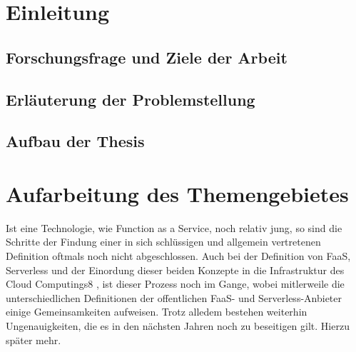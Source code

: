 \documentclass[11pt]{article}
\begin{document}
\section{Einleitung}
\subsection{Forschungsfrage und Ziele der Arbeit}
\subsection{Erläuterung der Problemstellung}
\subsection{Aufbau der Thesis}










\section{Aufarbeitung des Themengebietes}
Ist eine Technologie, wie Function as a Service, noch relativ jung, so sind die Schritte der Findung einer in sich schlüssigen und allgemein vertretenen Definition oftmals noch nicht abgeschlossen. Auch bei der Definition von FaaS, Serverless und der Einordung dieser beiden Konzepte in die Infrastruktur des Cloud Computings8  \cite{mell2011nist}, ist dieser Prozess noch im Gange, wobei mitlerweile die unterschiedlichen Definitionen der offentlichen FaaS- und Serverless-Anbieter einige Gemeinsamkeiten aufweisen. Trotz alledem bestehen weiterhin Ungenauigkeiten, die es in den nächsten Jahren noch zu beseitigen gilt. Hierzu später mehr. \\\\
\end{document}
